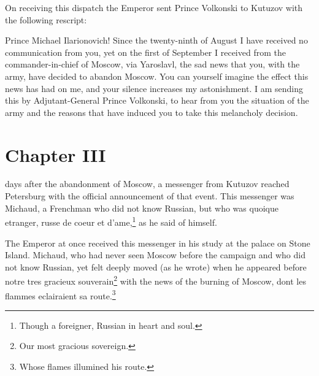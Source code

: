 On receiving this dispatch the Emperor sent Prince Volkonski to
Kutuzov with the following rescript:

Prince Michael Ilarionovich! Since the twenty-ninth of August I
have received no communication from you, yet on the first of
September I received from the commander-in-chief of Moscow, via
Yaroslavl, the sad news that you, with the army, have decided to
abandon Moscow. You can yourself imagine the effect this news has
had on me, and your silence increases my astonishment. I am
sending this by Adjutant-General Prince Volkonski, to hear from
you the situation of the army and the reasons that have induced
you to take this melancholy decision.


\chapter*{Chapter III} \ifaudio {}
\fi 

 days after the abandonment of Moscow, a messenger from
Kutuzov reached Petersburg with the official announcement of that
event. This messenger was Michaud, a Frenchman who did not know
Russian, but who was quoique etranger, russe de coeur et
d'ame,\footnote{Though a foreigner, Russian in heart and soul.}
as he said of himself.

The Emperor at once received this messenger in his study at the
palace on Stone Island. Michaud, who had never seen Moscow before
the campaign and who did not know Russian, yet felt deeply moved
(as he wrote) when he appeared before notre tres gracieux
souverain\footnote{Our most gracious sovereign.} with the news of
the burning of Moscow, dont les flammes eclairaient sa
route.\footnote{Whose flames illumined his route.}

